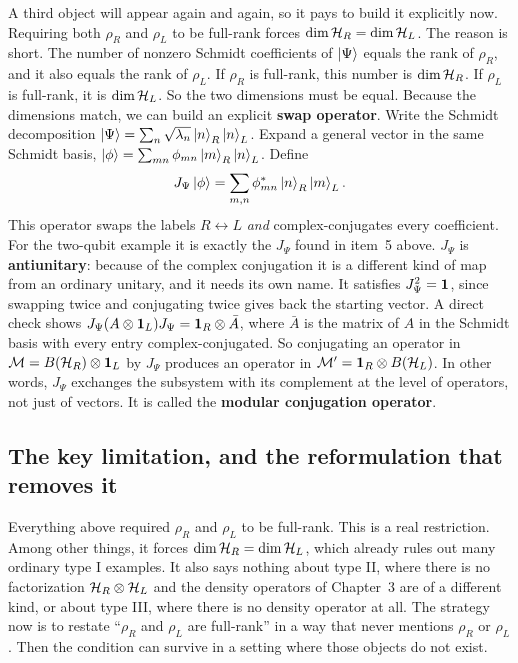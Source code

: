 A third object will appear again and again, so it pays to build it explicitly now. Requiring both $\rho_R$ and
$\rho_L$ to be full-rank forces $\dim\mathcal{H}_R=\dim\mathcal{H}_L$. The reason is short. The number of nonzero Schmidt
coefficients of $\ket\Psi$ equals the rank of $\rho_R$, and it also equals the rank of $\rho_L$. If $\rho_R$ is
full-rank, this number is $\dim\mathcal{H}_R$. If $\rho_L$ is full-rank, it is $\dim\mathcal{H}_L$. So the two dimensions must
be equal. Because the dimensions match, we can build an explicit \textbf{swap operator}. Write the Schmidt
decomposition $\ket\Psi=\sum_n\sqrt{\lambda_n}\ket n_R\ket n_L$. Expand a general vector in the same Schmidt
basis, $\ket\phi=\sum_{mn}\phi_{mn}\ket m_R\ket n_L$. Define
\[
J_\Psi\ket\phi = \sum_{m,n}\phi_{mn}^*\ket n_R\ket m_L .
\]
This operator swaps the labels $R\leftrightarrow L$ \emph{and} complex-conjugates every coefficient. For the
two-qubit example it is exactly the $J_\Psi$ found in item~5 above. $J_\Psi$ is \textbf{antiunitary}: because
of the complex conjugation it is a different kind of map from an ordinary unitary, and it needs its own name.
It satisfies $J_\Psi^2=\mathbf{1}$, since swapping twice and conjugating twice gives back the starting vector. A
direct check shows $J_\Psi(A\otimes\mathbf{1}_L)J_\Psi=\mathbf{1}_R\otimes\bar A$, where $\bar A$ is the matrix of $A$ in
the Schmidt basis with every entry complex-conjugated. So conjugating an operator in $\mathcal{M}=B(\mathcal{H}_R)\otimes\mathbf{1}_L$
by $J_\Psi$ produces an operator in $\mathcal{M}'=\mathbf{1}_R\otimes B(\mathcal{H}_L)$. In other words, $J_\Psi$ exchanges the
subsystem with its complement at the level of operators, not just of vectors. It is called the
\textbf{modular conjugation operator}.

\subsection*{The key limitation, and the reformulation that removes it}

Everything above required $\rho_R$ and $\rho_L$ to be full-rank. This is a real restriction. Among other
things, it forces $\dim\mathcal{H}_R=\dim\mathcal{H}_L$, which already rules out many ordinary type I examples. It also says
nothing about type II, where there is no factorization $\mathcal{H}_R\otimes\mathcal{H}_L$ and the density operators of
Chapter~3 are of a different kind, or about type III, where there is no density operator at all. The strategy
now is to restate ``$\rho_R$ and $\rho_L$ are full-rank'' in a way that never mentions $\rho_R$ or $\rho_L$.
Then the condition can survive in a setting where those objects do not exist.

